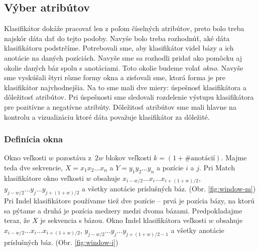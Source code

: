 \subsection{Výber atribútov}

Klasifikátor dokáže pracovať len z poľom číselných atribútov, preto bolo treba najskôr dáta dať do tejto podoby. Navyše bolo treba rozhodnúť, aké dáta klasifikátoru podstrčíme. Potrebovali sme, aby klasifikátor videl bázy a ich anotácie na daných pozíciách. Navyše sme sa rozhodli pridať ako pomôcku aj okolie daných báz spolu s anotáciami. Toto okolie budeme volať \textit{okno}. Navyše sme vyskúšali štyri rôzne formy okna a zisťovali sme, ktorá forma je pre klasifikátor najvhodnejšia. Na to sme mali dve miery: úspešnosť klasifikátora a dôležitosť atribútov. Pri úspešnosti sme sledovali rozdelenie výstupu klasifikátora pre pozitívne a negatívne atribúty. Dôležitosť atribútov sme mali hlavne na kontrolu a vizualizáciu ktoré dáta považuje klasifikátor za dôležité.

\subsubsection{Definícia okna}
Okno veľkosti $w$ pozostáva z~$2w$ blokov veľkosti $k = (1+\#\text{anotácií})$.
Majme teda dve sekvencie, $X = x_1 x_2 \dots x_n$ a $Y = y_1 y_2 \dots y_n$ a pozície $i$ a $j$.
Pri Match klasifikátore okno veľkosti $w$ obsahuje $x_{i - w/2}\dots x_i \dots x_{i + (1 + w)/2}$, $y_{j - w/2}\dots y_j \dots y_{j + (1 + w)/2}$ a všetky anotácie príslušných báz. (Obr. \ref{fig:window-m})
Pri Indel klasifikátore používame tiež dve pozície -- prvá je pozícia bázy, na ktorú sa pýtame a druhá je pozícia medzery medzi dvoma bázami.
Predpokladajme teraz, že $X$ je sekvencia s bázou. Okno Indel klasifikátora veľkosti $w$ obsahuje $x_{i - w/2}\dots x_i \dots x_{i + (1 + w)/2}$, $y_{j - w/2}\dots y_j \dots y_{j + (1 + w)/2 - 1}$ a všetky anotácie príslušných báz. (Obr. \ref{fig:window-i})

